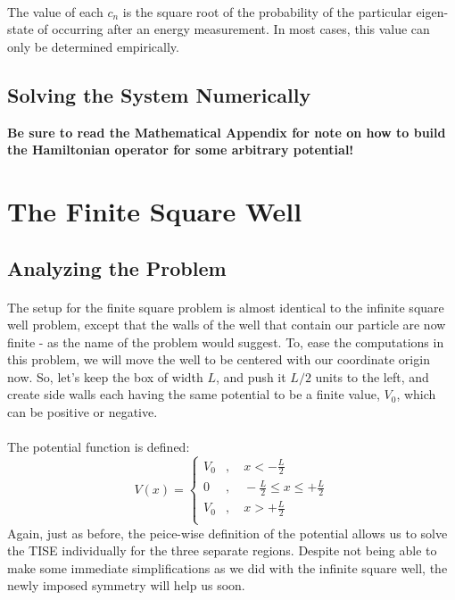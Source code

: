 \documentclass[12pt,letterpaper]{book}
\begin{document}
\paragraph*{}The value of each $c_n$ is the square root of the probability of the particular eigen-state of occurring after an energy measurement. In most cases, this value can only be determined empirically.


\subsection*{Solving the System Numerically}
\textbf{Be sure to read the Mathematical Appendix for note on how to build the Hamiltonian operator for some arbitrary potential!}



\section{The Finite Square Well}


\subsection*{Analyzing the Problem}
\paragraph*{}The setup for the finite square problem is almost identical to the infinite square well problem, except that the walls of the well that contain our particle are now finite - as the name of the problem would suggest. To, ease the computations in this problem, we will move the well to be centered with our coordinate origin now. So, let's keep the box of width $L$, and push it $L/2$ units to the left, and create side walls each having the same potential to be a finite value, $V_0$, which can be positive or negative.
\paragraph*{}The potential function is defined:
\begin{equation}
\label{FSW potential}
V(x) = \left\{
        \begin{array}{ll}
            V_0 &, \quad x < -\frac{L}{2} \\
            0 		&, \quad -\frac{L}{2} \leq x \leq +\frac{L}{2} \\
            V_0 &, \quad x > +\frac{L}{2} \\
        \end{array}
    \right.
\end{equation}
Again, just as before, the peice-wise definition of the potential allows us to solve the TISE individually for the three separate regions. Despite not being able to make some immediate simplifications as we did with the infinite square well, the newly imposed symmetry will help us soon.
\end{document}

